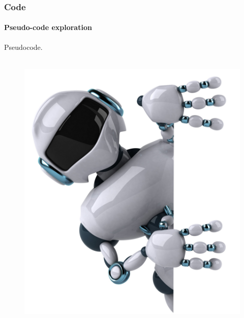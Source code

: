 \documentclass{beamer}
\begin{document}

\begin{frame}
\frametitle{Code}
\framesubtitle{Pseudo-code exploration}
Pseudocode.\\~\\
\end{frame}



\begin{frame}
\begin{figure}[hbtp]
\centering
\includegraphics[scale=0.1]{figures/bye-bye.jpeg}
\end{figure}
\end{frame}

\end{document}
